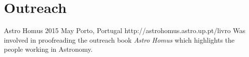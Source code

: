 \section{Outreach}


{Astro Homus}%
{2015 May}%
{Porto, Portugal}%
{http://astrohomus.astro.up.pt/livro}%
{}%
{Was involved in proofreading the outreach book \emph{Astro Homus} \citep{figueira_astro_2015}  which highlights the people working in Astronomy.}%

